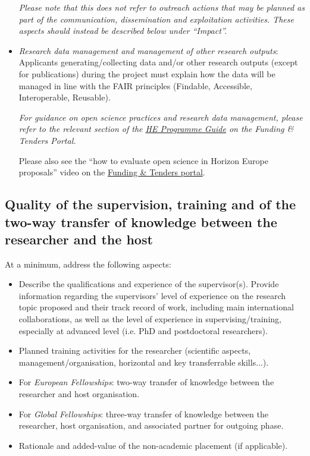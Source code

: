 \documentclass[11pt,draftproposal]{msca-pf}
\begin{document}
\begin{itemize}
    \emph{Please note that this does not refer to outreach actions that may be
    planned as part of the communication, dissemination and exploitation activities.
    These aspects should instead be described below under ``Impact''.}

    \item \emph{Research data management and management of other research outputs}:
    Applicants generating/collecting data and/or other research outputs (except for
    publications) during the project must explain how the data will be managed
    in line with the FAIR principles (Findable, Accessible, Interoperable,
    Reusable).

    \emph{For guidance on open science practices and research data management,
    please refer to the relevant section of the \href{https://ec.europa.eu/info/funding-tenders/opportunities/docs/2021-2027/horizon/guidance/programme-guide_horizon_en.pdf}{HE Programme Guide}
    on the Funding \& Tenders Portal.}

    Please also see the “how to evaluate open science in Horizon Europe proposals”
    video on the \href{https://ec.europa.eu/info/funding-tenders/opportunities/portal/screen/support/videos}{Funding \& Tenders portal}.
\end{itemize}

\subsection{Quality of the supervision, training and of the two-way transfer of
knowledge between the researcher and the host}

At a minimum, address the following aspects:

\begin{itemize}
    \item Describe the qualifications and experience of the supervisor(s).
    Provide information regarding the supervisors' level of experience on the
    research topic proposed and their track record of work, including main
    international collaborations, as well as the level of experience in
    supervising/training, especially at advanced level (i.e. PhD and postdoctoral
    researchers).

    \item Planned training activities for the researcher (scientific aspects,
    management/organisation, horizontal and key transferrable skills...).

    \item For \emph{European Fellowships}: two-way transfer of knowledge between
    the researcher and host organisation.

    \item For \emph{Global Fellowships}: three-way transfer of knowledge between
    the researcher, host organisation, and associated partner for outgoing phase.

    \item Rationale and added-value of the non-academic placement (if applicable).
\end{itemize}
\end{document}
